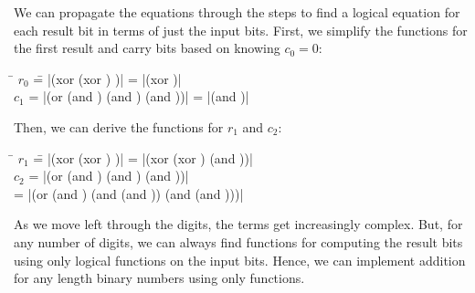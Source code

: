 \begin{schemeregion}
We can propagate the equations through the steps to find a logical equation for each result bit in terms of just the input bits.  First, we simplify the functions for the first result and carry bits based on knowing $c_0 = 0$:
\begin{tabbing}
\hspace{.2in} \= $r_0$ \= = \scheme|(xor (xor \az \bz) \cz)| = \scheme|(xor \az \bz)| \\
              \> $c_1$ \> = \scheme|(or (and \az \bz) (and \az \cz) (and \bz \cz))| = \scheme|(and \az \bz)|
\end{tabbing}
Then, we can derive the functions for $r_1$ and $c_2$:
\begin{tabbing}
\hspace{.2in} \= $r_1$ \= = \scheme|(xor (xor \aone \bone) \cone)| = \scheme|(xor (xor \aone \bone) (and \az \bz))|\\
              \> $c_2$ \> = \scheme|(or (and \aone \bone) (and \aone \cone) (and \bone \cone))| \\
              \>       \> = \scheme|(or (and \aone \bone) (and \aone (and \az \bz)) (and \bone (and \az \bz)))|
\end{tabbing}

As we move left through the digits, the terms get increasingly complex.  But, for any number of digits, we can always find functions for computing the result bits using only logical functions on the input bits.  Hence, we can implement addition for any length binary numbers using only  functions.



\end{schemeregion}
